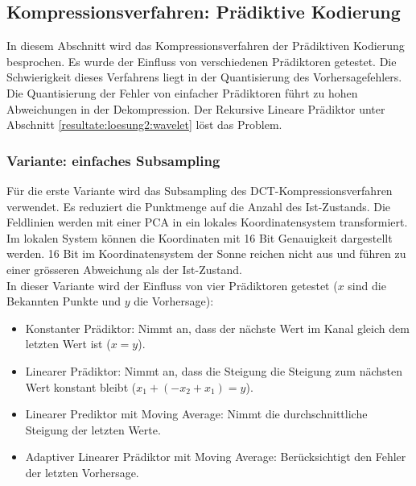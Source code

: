 \subsection{Kompressionsverfahren: Prädiktive Kodierung}  \label{resultate:loesung2}
In diesem Abschnitt wird das Kompressionsverfahren der Prädiktiven Kodierung besprochen. Es wurde der Einfluss von verschiedenen Prädiktoren getestet. Die Schwierigkeit dieses Verfahrens liegt in der Quantisierung des Vorhersagefehlers. Die Quantisierung der Fehler von einfacher Prädiktoren führt zu hohen Abweichungen in der Dekompression. Der Rekursive Lineare Prädiktor unter Abschnitt \ref{resultate:loesung2:wavelet} löst das Problem.

\subsubsection{Variante: einfaches Subsampling}
Für die erste Variante wird das Subsampling des DCT-Kompressionsverfahren verwendet. Es reduziert die Punktmenge auf die Anzahl des Ist-Zustands. Die Feldlinien werden mit einer PCA in ein lokales Koordinatensystem transformiert. Im lokalen System können die Koordinaten mit 16 Bit Genauigkeit dargestellt werden. 16 Bit im Koordinatensystem der Sonne reichen nicht aus und führen zu einer grösseren Abweichung als der Ist-Zustand.\\
In dieser Variante wird der Einfluss von vier Prädiktoren getestet ($x$ sind die Bekannten Punkte und $y$ die Vorhersage):
\begin{itemize}
\item Konstanter Prädiktor: Nimmt an, dass der nächste Wert im Kanal gleich dem  letzten Wert ist ($x = y$).
\item Linearer Prädiktor: Nimmt an, dass die Steigung die Steigung zum nächsten Wert konstant bleibt ($x_1+(-x_2+x_1) = y$).
\item Linearer Prediktor mit Moving Average: Nimmt die durchschnittliche Steigung der letzten Werte.
\item Adaptiver Linearer Prädiktor mit Moving Average: Berücksichtigt den Fehler der letzten Vorhersage.
\end{itemize}

